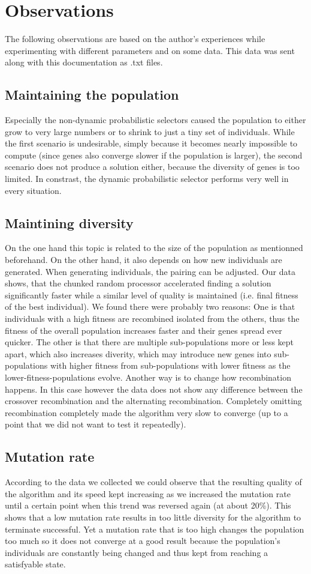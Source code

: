 \documentclass[a4paper,10pt]{article}
\begin{document}
\section{Observations}
The following observations are based on the author's experiences while experimenting with different parameters and on some data. This data was sent along with this documentation as .txt files.
\subsection{Maintaining the population}
Especially the non-dynamic probabilistic selectors caused the population to either grow to very large numbers or to shrink to just a tiny set of individuals. While the first scenario is undesirable, simply because it becomes nearly impossible to compute (since genes also converge slower if the population is larger), the second scenario does not produce a solution either, because the diversity of genes is too limited. In constrast, the dynamic probabilistic selector performs very well in every situation.
\subsection{Maintining diversity}
On the one hand this topic is related to the size of the population as mentionned beforehand. On the other hand, it also depends on how new individuals are generated. When generating individuals, the pairing can be adjusted. Our data shows, that the chunked random processor accelerated finding a solution significantly faster while a similar level of quality is maintained (i.e. final fitness of the best individual). We found there were probably two reasons: One is that individuals with a high fitness are recombined isolated from the others, thus the fitness of the overall population increases faster and their genes spread ever quicker. The other is that there are multiple sub-populations more or less kept apart, which also increases diverity, which may introduce new genes into sub-populations with higher fitness from sub-populations with lower fitness as the lower-fitness-populations evolve. Another way is to change how recombination happens. In this case however the data does not show any difference between the crossover recombination and the alternating recombination. Completely omitting recombination completely made the algorithm very slow to converge (up to a point that we did not want to test it repeatedly).
\subsection{Mutation rate}
According to the data we collected we could observe that the resulting quality of the algorithm and its speed kept increasing as we increased the mutation rate until a certain point when this trend was reversed again (at about 20\%). This shows that a low mutation rate results in too little diversity for the algorithm to terminate successful. Yet a mutation rate that is too high changes the population too much so it does not converge at a good result because the population's individuals are constantly being changed and thus kept from reaching a satisfyable state.
\end{document}
